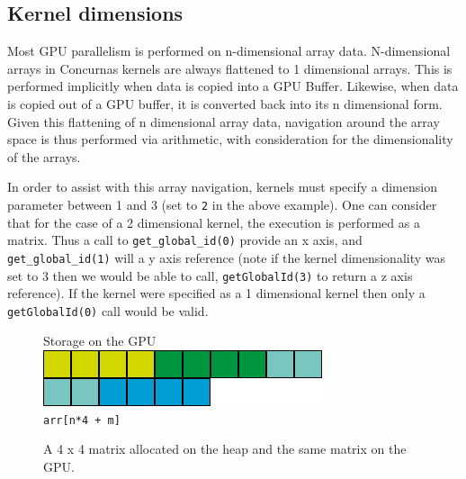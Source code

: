 \documentclass[conc-doc]{subfiles}
\begin{document}
\subsection{Kernel dimensions}
Most GPU parallelism is performed on n-dimensional array data. N-dimensional arrays in Concurnas kernels are always flattened to 1 dimensional arrays. This is performed implicitly when data is copied into a GPU Buffer. Likewise, when data is copied out of a GPU buffer, it is converted back into its n dimensional form. Given this flattening of n dimensional array data, navigation around the array space is thus performed via arithmetic, with consideration for the dimensionality of the arrays.

In order to assist with this array navigation, kernels must specify a dimension parameter between 1 and 3 (set to \lstinline{2} in the above example). One can consider that for the case of a 2 dimensional kernel, the execution is performed as a matrix. Thus a call to \lstinline{get_global_id(0)} provide an x axis, and \lstinline{get_global_id(1)} will a y axis reference (note if the kernel dimensionality was set to 3 then we would be able to call, \lstinline{getGlobalId(3)} to return a z axis reference). If the kernel were specified as a 1 dimensional kernel then only a \lstinline{getGlobalId(0)} call would be valid.


\begin{figure}[H]
	{
		Storage on the GPU\\
		\includegraphics[width=.45\textwidth]{images/gpu-heap2.png}\\
		\lstinline{arr[n*4 + m]}
	}
	\caption{A 4 x 4 matrix allocated on the heap and the same matrix on the GPU.}
	\label{fig:memAllocation}
\end{figure}
\end{document}
